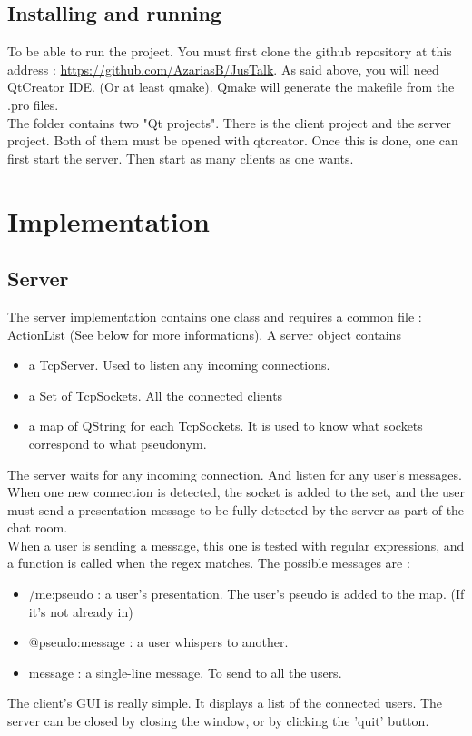 \documentclass[12pt]{report}
\begin{document}
\section{Installing and running}
To be able to run the project. You must first clone the github repository at this address : \url{https://github.com/AzariasB/JusTalk}.
As said above, you will need QtCreator IDE. (Or at least qmake). Qmake will generate the makefile from the .pro files.\\
The folder contains two "Qt projects". There is the client project and the server project. Both of them must be opened with qtcreator.
Once this is done, one can first start the server. Then start as many clients as one wants.
 
\chapter{Implementation}
\section{Server}
The server implementation contains one class and requires a common file : ActionList (See below for more informations). 
A server object contains
\begin{itemize}
	\item a TcpServer. Used to listen any incoming connections.
	\item a Set of TcpSockets. All the connected clients
	\item a map of QString for each TcpSockets. It is used to know what sockets correspond to what pseudonym. 
\end{itemize}
The server waits for any incoming connection. And listen for any user's messages.\\
When one new connection is detected, the socket is added to the set, and the user must send a presentation message to be fully detected by the server as part of the chat room.\\
When a user is sending a message, this one is tested with regular expressions, and a function is called when the regex matches.
The possible messages are :
\begin{itemize}
	\item /me:pseudo : a user's presentation. The user's pseudo is added to the map. (If it's not already in)
	\item @pseudo:message : a user whispers to another.
	\item message : a single-line message. To send to all the users.
\end{itemize}
The client's GUI is really simple. It displays a list of the connected users. The server can be closed by closing the window, or by clicking the 'quit' button.
\end{document}
